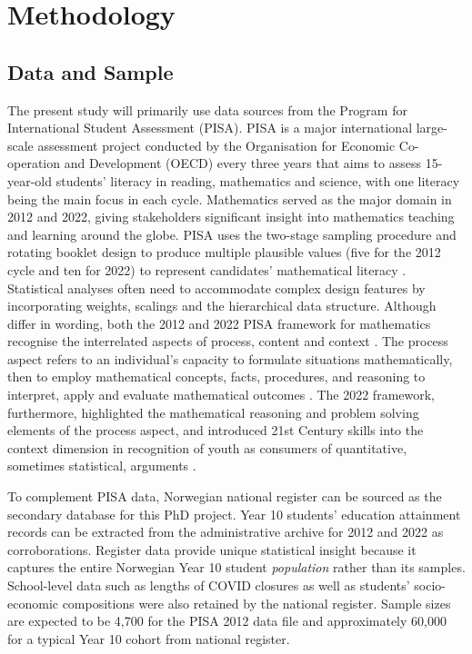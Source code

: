 \documentclass[
    a4paper,                %
    11pt,                   %
    stu,                    %
    donotrepeattitle,       %
    floatsintext,           %
    biblatex,               %
    colorlinks=true,        %
    linkcolor=red,          %
    anchorcolor=black,      %
    citecolor=blue,         %
    urlcolor=blue,          %
    bookmarks=true,         %
    bookmarksopen=false,    %
    bookmarksnumbered=true, %
    dvipsnames              %
]{apa7}
\begin{document}
\section{Methodology}

\subsection{Data and Sample}

The present study will primarily use data sources from the Program for International Student Assessment (PISA). PISA is a major international large-scale assessment project conducted by the Organisation for Economic Co-operation and Development (OECD) every three years that aims to assess 15-year-old students' literacy in reading, mathematics and science, with one literacy being the main focus in each cycle. Mathematics served as the major domain in 2012 and 2022, giving stakeholders significant insight into mathematics teaching and learning around the globe. PISA uses the two-stage sampling procedure and rotating booklet design to produce multiple plausible values (five for the 2012 cycle and ten for 2022) to represent candidates' mathematical literacy \parencite{rust:2014}. Statistical analyses often need to accommodate complex design features by incorporating weights, scalings and the hierarchical data structure. Although differ in wording, both the 2012 and 2022 PISA framework for mathematics recognise the interrelated aspects of process, content and context \parencite{oecd:2013}. The process aspect refers to an individual's capacity to formulate situations mathematically, then to employ mathematical concepts, facts, procedures, and reasoning to interpret, apply and evaluate mathematical outcomes \parencite[][p. 28]{oecd:2013}. The 2022 framework, furthermore, highlighted the mathematical reasoning and problem solving elements of the process aspect, and introduced 21st Century skills into the context dimension in recognition of youth as consumers of quantitative, sometimes statistical, arguments \parencite{oecd:2018}.

To complement PISA data, Norwegian national register can be sourced as the secondary database for this PhD project. Year 10 students' education attainment records can be extracted from the administrative archive for 2012 and 2022 as corroborations. Register data provide unique statistical insight because it captures the entire Norwegian Year 10 student \emph{population} rather than its samples. School-level data such as lengths of COVID closures as well as students' socio-economic compositions were also retained by the national register. Sample sizes are expected to be 4,700 for the PISA 2012 data file \parencite{oecd:2014} and approximately 60,000 for a typical Year 10 cohort from national register.
\end{document}
